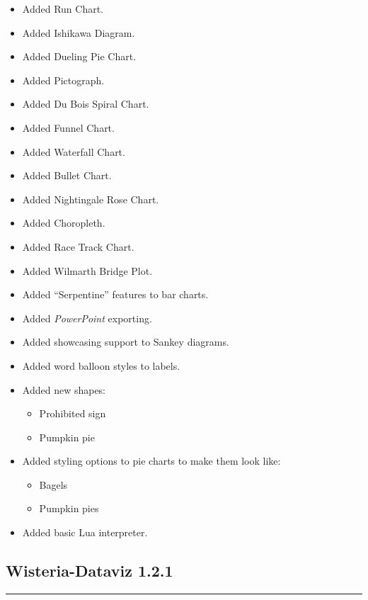 \documentclass[
]{scrartcl}
\providecommand{\tightlist}{%
  \setlength{\itemsep}{0pt}\setlength{\parskip}{0pt}}
\begin{document}
\begin{itemize}
\tightlist
\item
  Added Run Chart.
\item
  Added Ishikawa Diagram.
\item
  Added Dueling Pie Chart.
\item
  Added Pictograph.
\item
  Added Du Bois Spiral Chart.
\item
  Added Funnel Chart.
\item
  Added Waterfall Chart.
\item
  Added Bullet Chart.
\item
  Added Nightingale Rose Chart.
\item
  Added Choropleth.
\item
  Added Race Track Chart.
\item
  Added Wilmarth Bridge Plot.
\item
  Added ``Serpentine'' features to bar charts.
\item
  Added \emph{PowerPoint} exporting.
\item
  Added showcasing support to Sankey diagrams.
\item
  Added word balloon styles to labels.
\item
  Added new shapes:

  \begin{itemize}
  \tightlist
  \item
    Prohibited sign
  \item
    Pumpkin pie
  \end{itemize}
\item
  Added styling options to pie charts to make them look like:

  \begin{itemize}
  \tightlist
  \item
    Bagels
  \item
    Pumpkin pies
  \end{itemize}
\item
  Added basic Lua interpreter.
\end{itemize}

\subsection*{Wisteria-Dataviz 1.2.1}\label{section-2}

\begin{center}\rule{0.5\linewidth}{0.5pt}\end{center}
\end{document}
